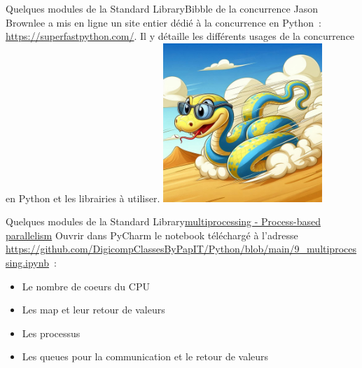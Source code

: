 \documentclass{beamer}
\begin{document}
    \begin{frame}{Quelques modules de la Standard Library}{Bibble de la concurrence}
        Jason Brownlee a mis en ligne un site entier dédié à la concurrence en Python~: \url{https://superfastpython.com/}.
        \bigbreak
        Il y détaille les différents usages de la concurrence en Python et les librairies à utiliser.
        \bigbreak
        \centering
        \includegraphics[width=6cm]{image/super-fast-python}
    \end{frame}


    \begin{frame}{Quelques modules de la Standard Library}{\href{https://docs.python.org/3/library/multiprocessing.html}{multiprocessing - Process-based parallelism}}
        \bigbreak
        Ouvrir dans PyCharm le notebook téléchargé à l'adresse \url{https://github.com/DigicompClassesByPapIT/Python/blob/main/9_multiprocessing.ipynb}~:
        \begin{itemize}
            \item Le nombre de coeurs du CPU
            \item Les map et leur retour de valeurs
            \item Les processus
            \item Les queues pour la communication et le retour de valeurs
        \end{itemize}
    \end{frame}
\end{document}
